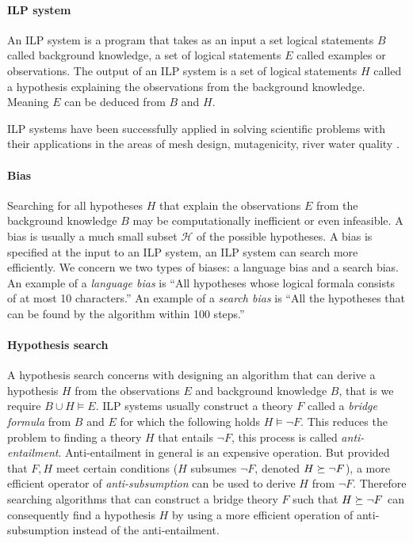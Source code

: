 \paragraph{ILP system}
An ILP system is a program that takes as an input a set logical statements $B$ called background knowledge, a set of logical statements $E$ called examples or observations. The output of an ILP system is a set of logical statements $H$ called a hypothesis explaining the observations from the background knowledge. Meaning $E$ can be deduced from $B$ and $H$.

ILP systems have been successfully applied in solving scientific problems with their applications in the areas of mesh design, mutagenicity, river water quality 
\cite{bratko1995applications}.

\paragraph{Bias}
Searching for all hypotheses $H$ that explain the observations $E$ from the background knowledge $B$ may be computationally inefficient or even infeasible. A bias is usually a much small subset $\mathcal{H}$ of the possible hypotheses. A bias is specified at the input to an ILP system, an ILP system can search more efficiently. We concern we two types of biases: a language bias and a search bias. An example of a \emph{language bias} is ``All hypotheses whose logical formala consists of at most 10 characters.'' An example of a \emph{search bias} is ``All the hypotheses that can be found by the algorithm within 100 steps.''

\paragraph{Hypothesis search}
A hypothesis search concerns with designing an algorithm that can derive a hypothesis $H$ from the observations $E$ and background knowledge $B$, that is we require $B \cup H \models E$. ILP systems usually construct a theory $F$ called a \emph{bridge formula} from $B$ and $E$ for which the following holds $H \models \neg F$. This reduces the problem to finding a theory $H$ that entails $\neg F$, this process is called \emph{anti-entailment}. Anti-entailment in general is an expensive operation. But provided that $F, H$ meet certain conditions ($H$ subsumes $\neg F$, denoted $H \succeq \neg F$), a more efficient operator of \emph{anti-subsumption} can be used to derive $H$ from $\neg F$. Therefore searching algorithms that can construct a bridge theory $F$ such that $H \succeq \neg F$ can consequently find a hypothesis $H$ by using a more efficient operation of anti-subsumption instead of the anti-entailment.

